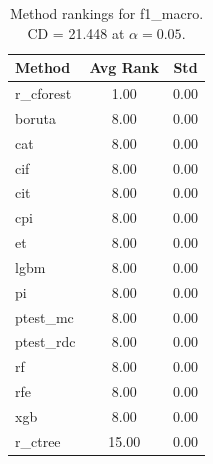 \begin{table}[h]
\centering
\caption{Method rankings for f1_macro. CD = 21.448 at $\alpha=0.05$.}
\label{tab:ranks_f1_macro}
\begin{tabular}{lcc}
\toprule
Method & Avg Rank & Std \\
\midrule
r_cforest & 1.00 & 0.00 \\
boruta & 8.00 & 0.00 \\
cat & 8.00 & 0.00 \\
cif & 8.00 & 0.00 \\
cit & 8.00 & 0.00 \\
cpi & 8.00 & 0.00 \\
et & 8.00 & 0.00 \\
lgbm & 8.00 & 0.00 \\
pi & 8.00 & 0.00 \\
ptest_mc & 8.00 & 0.00 \\
ptest_rdc & 8.00 & 0.00 \\
rf & 8.00 & 0.00 \\
rfe & 8.00 & 0.00 \\
xgb & 8.00 & 0.00 \\
r_ctree & 15.00 & 0.00 \\
\bottomrule
\end{tabular}
\end{table}